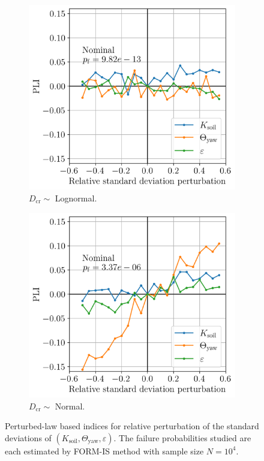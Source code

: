 \begin{figure}
    \centering
    \begin{subfigure}[t]{0.48\linewidth}
        \includegraphics[width=\linewidth]{./part3/figures/OWT/PLI_ALL_Hyp_LogNormal.png}
        \caption{$D_{\mathrm{cr}} \sim $ Lognormal.}
    \end{subfigure}
    \begin{subfigure}[t]{0.48\linewidth}
        \includegraphics[width=\linewidth]{./part3/figures/OWT/PLI_ALL_Hyp_Normal.png}
        \caption{$D_{\mathrm{cr}} \sim $ Normal.}
    \end{subfigure}
    \caption{Perturbed-law based indices for relative perturbation of the standard deviations of $(K_{\mathrm{soil}}, \Theta_{\mathrm{yaw}}, \varepsilon)$. 
    The failure probabilities studied are each estimated by FORM-IS method with sample size $N=10^4$.}
    \label{fig:pli_all}
\end{figure}


